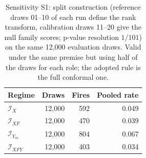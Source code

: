 \begin{table}[!t]
\caption{Sensitivity S1: split construction (reference draws 01--10 of each run define the rank transform, calibration draws 11--20 give the null family scores; p-value resolution $1/101$) on the same 12,000 evaluation draws. Valid under the same premise but using half of the draws for each role; the adopted rule is the full conformal one.}
\label{tab:s-family-split}
\centering
\scriptsize
\setlength{\tabcolsep}{4pt}
\begin{tabular}{@{}lrrr@{}}
\toprule
Regime & Draws & Fires & Pooled rate \\
\midrule
$\mathcal I_X$ & 12,000 & 592 & 0.049 \\
$\mathcal I_{XF}$ & 12,000 & 470 & 0.039 \\
$\mathcal I_{Y_m}$ & 12,000 & 804 & 0.067 \\
$\mathcal I_{XFY}$ & 12,000 & 403 & 0.034 \\
\bottomrule
\end{tabular}
\end{table}
